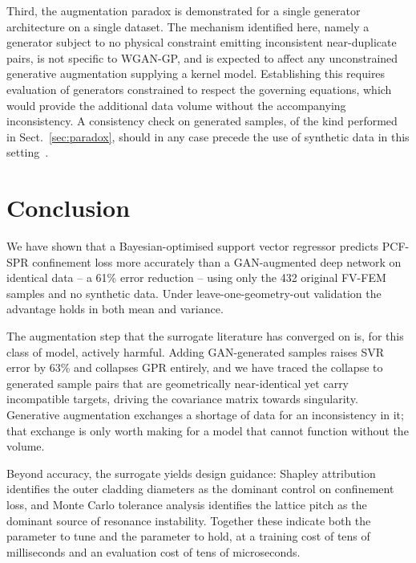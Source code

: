 \documentclass[iicol,pdflatex,sn-basic,Numbered]{sn-jnl}
\begin{document}
Third, the augmentation paradox is demonstrated for a single generator
architecture on a single dataset. The mechanism identified here, namely a
generator subject to no physical constraint emitting inconsistent near-duplicate
pairs, is not specific to WGAN-GP, and is expected to affect any unconstrained
generative augmentation supplying a kernel model. Establishing this requires
evaluation of generators constrained to respect the governing equations, which
would provide the additional data volume without the accompanying inconsistency.
A consistency check on generated samples, of the kind performed in
Sect.~\ref{sec:paradox}, should in any case precede the use of synthetic data in
this setting~\cite{juwara2024}.

\section{Conclusion}\label{sec:conclusion}

We have shown that a Bayesian-optimised support vector regressor predicts PCF-SPR
confinement loss more accurately than a GAN-augmented deep network on identical
data -- a 61\% error reduction -- using only the 432 original FV-FEM samples and
no synthetic data. Under leave-one-geometry-out validation the advantage holds in
both mean and variance.

The augmentation step that the surrogate literature has converged on is, for this
class of model, actively harmful. Adding GAN-generated samples raises SVR error by
63\% and collapses GPR entirely, and we have traced the collapse to generated
sample pairs that are geometrically near-identical yet carry incompatible
targets, driving the covariance matrix towards singularity. Generative
augmentation exchanges a shortage of data for an inconsistency in it; that
exchange is only worth making for a model that cannot function without the
volume.

Beyond accuracy, the surrogate yields design guidance: Shapley attribution
identifies the outer cladding diameters as the dominant control on confinement
loss, and Monte Carlo tolerance analysis identifies the lattice pitch as the
dominant source of resonance instability. Together these indicate both the
parameter to tune and the parameter to hold, at a training cost of tens of
milliseconds and an evaluation cost of tens of microseconds.

\backmatter
\end{document}
